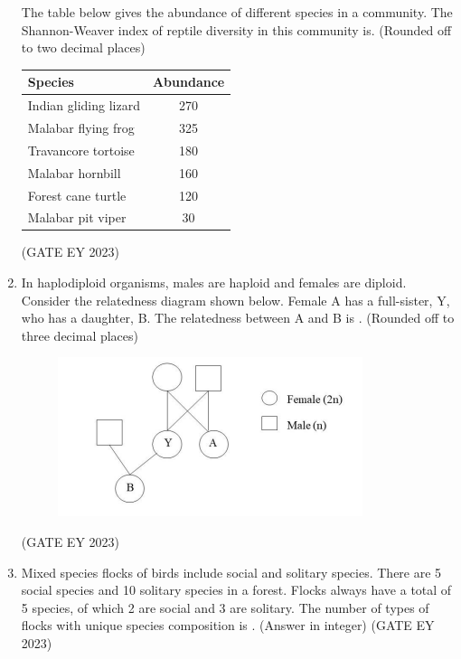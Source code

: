 \documentclass[journal,12pt,onecolumn]{IEEEtran}
\theoremstyle{remark}
\begin{document}
\begin{enumerate}
The table below gives the abundance of different species in a community. The
Shannon-Weaver index of reptile diversity in this community is\underline{\hspace{1.5cm}}.
(Rounded off to two decimal places)
\begin{table}[h!]
\centering
\begin{tabular}{|l|c|}
\hline
\textbf{Species} & \textbf{Abundance} \\ \hline
Indian gliding lizard & 270 \\ \hline
Malabar flying frog   & 325 \\ \hline
Travancore tortoise   & 180 \\ \hline
Malabar hornbill      & 160 \\ \hline
Forest cane turtle    & 120 \\ \hline
Malabar pit viper     & 30  \\ \hline
\end{tabular}
\end{table}

\hfill{(GATE EY 2023)}

 \item In haplodiploid organisms, males are haploid and females are diploid. Consider the
relatedness diagram shown below. Female A has a full-sister, Y, who has a
daughter, B. The relatedness between A and B is \underline{\hspace{1.5cm}} .
(Rounded off to three decimal places)
\begin{figure}[H]
    \centering
    \includegraphics[]{figs/Q.63.png}
    \caption{}
    \label{fig:16}
\end{figure}

\hfill{(GATE EY 2023)}


 \item Mixed species flocks of birds include social and solitary species. There are 5 social
species and 10 solitary species in a forest. Flocks always have a total of 5 species,
of which 2 are social and 3 are solitary. The number of types of flocks with unique
species composition is \underline{\hspace{1.5cm}}. (Answer in integer)
\hfill{(GATE EY 2023)}


\end{enumerate}
\end{document}
